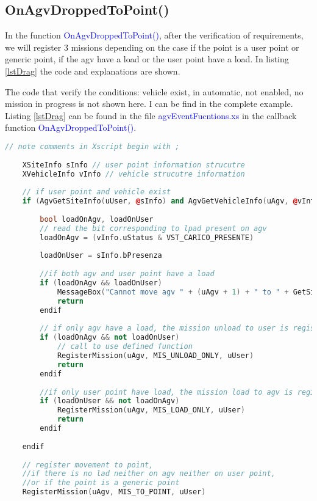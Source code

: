 %
\subsection*{OnAgvDroppedToPoint()}
In the function \textcolor{blue}{OnAgvDroppedToPoint()}, after the verification of requirements, we will register 3 missions depending on the case if the point is a user point or generic point, if the agv have a load or the user point have a load. In listing \ref{lstDrag} the code and explanations are shown.

The code that verify the conditions: vehicle exist, in automatic, not enabled, no mission in progress is not shown here. I can be find in the complete example.\\

Listing \ref{lstDrag} can be found in the file \textcolor{blue}{agvEventFucntions.xs} in the callback function \textcolor{blue}{OnAgvDroppedToPoint()}.

\begin{lstlisting}[language=c++, caption= Drag and drop to user point and generic point, label=lstDrag]
	// note comments in Xscript begin with ;
	
	XSiteInfo sInfo // user point information strucutre
	XVehicleInfo vInfo // vehicle strucutre information
	
	// if user point and vehicle exist
	if (AgvGetSiteInfo(uUser, @sInfo) and AgvGetVehicleInfo(uAgv, @vInfo))
	
		bool loadOnAgv, loadOnUser
		// read the bit corresponding to lpad present on agv
		loadOnAgv = (vInfo.uStatus & VST_CARICO_PRESENTE)
		
		loadOnUser = sInfo.bPresenza
		
		//if both agv and user point have a load
		if (loadOnAgv && loadOnUser)
			MessageBox("Cannot move agv " + (uAgv + 1) + " to " + GetSiteName(uUser) + " : both have a trolley")
			return
		endif
		
		// if only agv have a load, the mission unload to user is registered
		if (loadOnAgv && not loadOnUser)
			// call to use defined function
			RegisterMission(uAgv, MIS_UNLOAD_ONLY, uUser)
			return
		endif
		
		//if only user point have load, the mission load to agv is registerd.
		if (loadOnUser && not loadOnAgv)
			RegisterMission(uAgv, MIS_LOAD_ONLY, uUser)
			return
		endif
		
	endif
	
	// register movement to point, 
	//if there is no lad neither on agv neither on user point, 
	//or if the point is a generic point
	RegisterMission(uAgv, MIS_TO_POINT, uUser)
	
\end{lstlisting}

